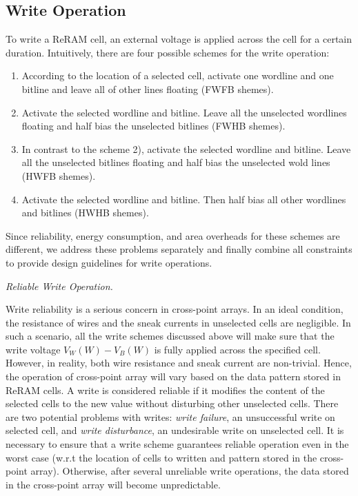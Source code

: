 \subsection{Write Operation}
To write a ReRAM cell, an external voltage is applied across the cell for a certain duration. Intuitively, there are four possible schemes for the write operation:
\begin{enumerate}
  \item According to the location of a selected cell, activate one wordline and one bitline and leave all of other lines floating (FWFB shemes).
  \item Activate the selected wordline and bitline. Leave all the unselected wordlines floating and half bias the unselected bitlines (FWHB shemes).
  \item In contrast to the scheme 2), activate the selected wordline and bitline. Leave all the unselected bitlines floating and half bias the unselected wold lines (HWFB shemes).
  \item Activate the selected wordline and bitline. Then half bias all other wordlines and bitlines (HWHB shemes).
\end{enumerate}
Since reliability, energy consumption, and area overheads for these
schemes are different, we address these problems
separately and finally combine all constraints to provide design
guidelines for write operations.

\vspace{6pt} \emph{Reliable Write Operation.} \vspace{6pt}

Write reliability is a serious concern in cross-point arrays. In an ideal condition, the resistance of wires and the sneak currents in unselected cells are negligible. In such a scenario, all the write schemes discussed above will make sure that the write voltage $V_W(W)-V_B(W)$ is fully applied across the specified cell. However, in reality, both wire resistance and sneak current are non-trivial. Hence, the operation of cross-point array will vary based on the data pattern stored in ReRAM cells.
A write is considered reliable if it modifies the content of the selected cells to the new value without disturbing other unselected cells.
There are two potential problems with writes: \emph{write failure}, an unsuccessful write on selected cell, and \emph{write disturbance}, an undesirable write on unselected cell. It is necessary to ensure that a write scheme guarantees reliable operation even in the worst case (w.r.t the location of cells to written and pattern stored in the cross-point array). Otherwise, after several unreliable write operations, the data stored in the cross-point array will become unpredictable.

